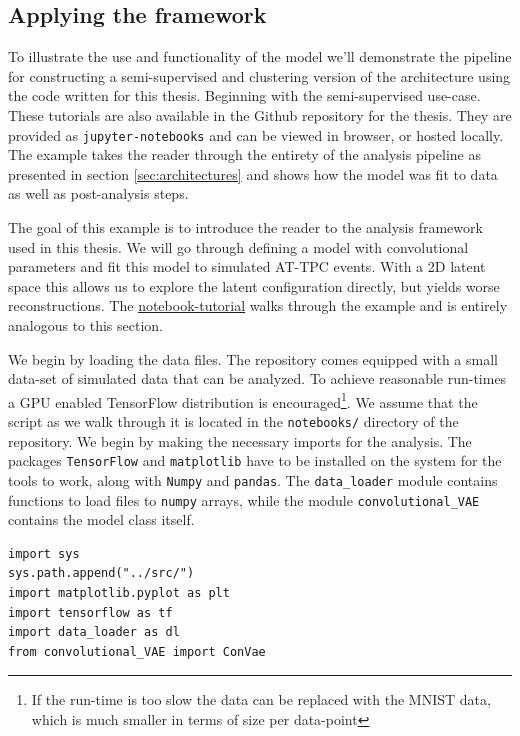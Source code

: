 \subsection{Applying the framework}

To illustrate the use and functionality of the model we'll demonstrate the pipeline for constructing a semi-supervised and clustering version of the architecture using the code written for this thesis. Beginning with the semi-supervised use-case. These tutorials are also available in the Github repository for the thesis. They are provided as \lstinline{jupyter-notebooks} and can be viewed in browser, or hosted locally. The example takes the reader through the entirety of the analysis pipeline as presented in section \ref{sec:architectures} and shows how the model was fit to data as well as post-analysis steps. 

The goal of this example is to introduce the reader to the analysis framework used in this thesis. We will go through defining a model with convolutional parameters and fit this model to simulated AT-TPC events. With a 2D latent space this allows us to explore the latent configuration directly, but yields worse reconstructions. The \href{https://github.com/ATTPC/VAE-event-classification/blob/master/notebooks/simulated_tutorial.ipynb}{notebook-tutorial} walks through the example and is entirely analogous to this section.

We begin by loading the data files. The repository comes equipped with a small data-set of simulated data that can be analyzed. To achieve reasonable run-times a GPU enabled TensorFlow distribution is encouraged\footnote{If the run-time is too slow the data can be replaced with the MNIST data, which is much smaller in terms of size per data-point}. We assume that the script as we walk through it is located in the \lstinline{notebooks/} directory of the repository. We begin by making the necessary imports for the analysis. The packages \lstinline{TensorFlow} and \lstinline{matplotlib} have to be installed on the system for the tools to work, along with \lstinline{Numpy} and \lstinline{pandas}. The \lstinline{data_loader} module contains functions to load files to \lstinline{numpy} arrays, while the module \lstinline{convolutional_VAE} contains the model class itself.

\begin{minipage}{\linewidth}
\begin{lstlisting}[language=iPython]
import sys
sys.path.append("../src/")
import matplotlib.pyplot as plt
import tensorflow as tf
import data_loader as dl
from convolutional_VAE import ConVae
\end{lstlisting}
\end{minipage}

